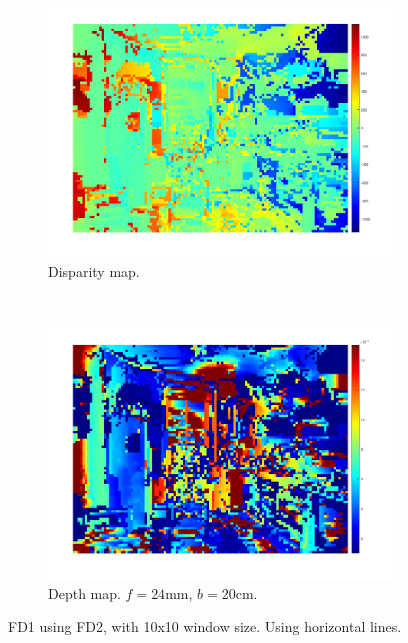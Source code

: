 \documentclass[a4paper, 10pt, conference]{ieeeconf}
\begin{document}
\begin{figure}[!ht]
  \captionsetup[subfigure]{position=b}
  \centering
    \begin{subfigure}{0.45\linewidth}
        \includegraphics[width=\linewidth]{pic/q2_2_cd4_dis}
        \caption{Disparity map.}
        \label{fig:depth10}
    \end{subfigure}
    ~
    \begin{subfigure}{0.45\linewidth}
        \includegraphics[width=\linewidth]{pic/q2_2_cd4_depth}
      	\caption{Depth map. $f = 24\text{mm}$, $b = 20\text{cm}$.}
        \label{fig:depth}
    \end{subfigure}

	\caption{FD1 using FD2, with 10x10 window size. Using horizontal lines.}
    \vspace{-0.5cm}
  \label{fig:q2_2_cd_4}
\end{figure}
\end{document}
